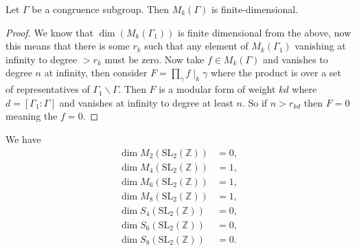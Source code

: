 \begin{theorem}\label{thm:dim-mf}
Let $\Gamma$ be a congruence subgroup. Then $M_k(\Gamma)$ is finite-dimensional.
\end{theorem}
\begin{proof}
We know that $\dim(M_k(\Gamma_1))$ is finite dimensional from the above, now this means that there is some $r_k$ such that any element of $M_k(\Gamma_1)$ vanishing at infinity to degree $> r_k$ must be zero. Now take $f \in M_k(\Gamma)$ and vanishes to degree $n$ at infinity, then consider $F = \prod_\gamma f\mid_k \gamma$ where the product is over a set of representatives of $\Gamma_1 \backslash \Gamma$. Then $F$ is a modular form of weight $k d$ where $d = [\Gamma_1: \Gamma]$ and vanishes at infinity to degree at least $n$. So if $n > r_{kd}$ then $F=0$ meaning the $f=0$.
\end{proof}


\begin{corollary}\label{cor:dim-mf}\leanok
We have
\begin{align}
    \dim M_2(\mathrm{SL}_{2}(\mathbb{Z})) &= 0, \label{eqn:dimM2} \\
    \dim M_4(\mathrm{SL}_{2}(\mathbb{Z})) &= 1, \label{eqn:dimM4} \\
    \dim M_6(\mathrm{SL}_{2}(\mathbb{Z})) &= 1, \label{eqn:dimM6} \\
    \dim M_8(\mathrm{SL}_{2}(\mathbb{Z})) &= 1, \label{eqn:dimM8} \\
    \dim S_4(\mathrm{SL}_{2}(\mathbb{Z})) &= 0, \label{eqn:dimS4} \\
    \dim S_6(\mathrm{SL}_{2}(\mathbb{Z})) &= 0, \label{eqn:dimS6} \\
    \dim S_8(\mathrm{SL}_{2}(\mathbb{Z})) &= 0. \label{eqn:dimS8}
\end{align}
\end{corollary}


